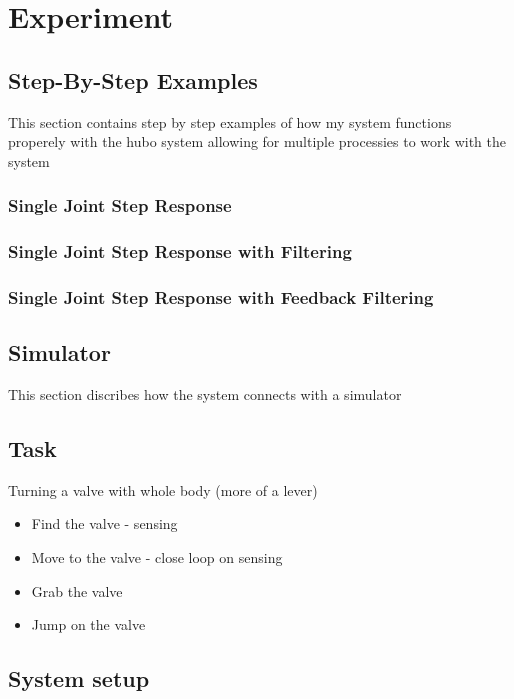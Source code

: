 \chapter{Experiment}
\section{Step-By-Step Examples}\label{sec:simpleExamples}
This section contains step by step examples of how my system functions properely with the hubo system allowing for multiple processies to work with the system

	\subsection{Single Joint Step Response}\label{sec:singlejointStep}
		
	\subsection{Single Joint Step Response with Filtering}\label{sec:singlejointFilter}
		
	\subsection{Single Joint Step Response with Feedback Filtering}\label{sec:singlejointEnc}
		


\section{Simulator}\label{sec:simulator}
This section discribes how the system connects with a simulator 


\section{Task}\label{sec:task}
Turning a valve with whole body (more of a lever)
\begin{itemize}
\item Find the valve - sensing
\item Move to the valve - close loop on sensing
\item Grab the valve
\item Jump on the valve
\end{itemize}



\section{System setup}

